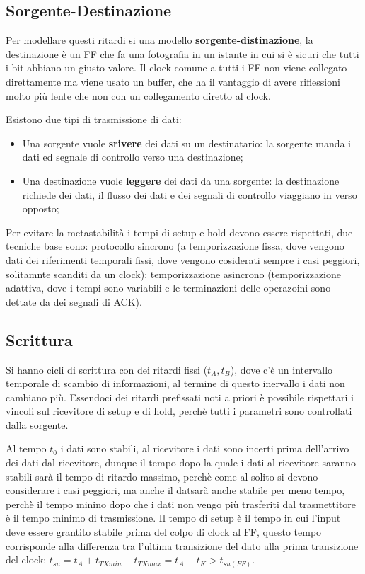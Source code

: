 \documentclass[12pt]{article}
\begin{document}
 \subsection{Sorgente-Destinazione}
Per modellare questi ritardi si una modello \textbf{sorgente-distinazione}, la destinazione \`e un FF che fa una fotografia in un istante in cui si \`e sicuri che tutti i bit abbiano un giusto valore. Il clock comune a tutti i FF non viene collegato direttamente ma viene usato un buffer, che ha il vantaggio di avere riflessioni molto pi\`u lente che non con un collegamento diretto al clock. 

Esistono due tipi di trasmissione di dati:
\begin{itemize}
    \item Una sorgente vuole \textbf{srivere} dei dati su un destinatario: la sorgente manda i dati ed segnale di controllo verso una destinazione;
    \item Una destinazione vuole \textbf{leggere} dei dati da una sorgente: la destinazione \\ richiede dei dati, il flusso dei dati e dei segnali di controllo viaggiano in verso opposto;
\end{itemize}
Per evitare la metastabilit\`a i tempi di setup e hold devono essere rispettati, due tecniche base sono: protocollo sincrono (a temporizzazione fissa, dove vengono dati dei riferimenti temporali fissi, dove vengono cosiderati sempre i casi peggiori, solitamnte scanditi da un clock); temporizzazione asincrono (temporizzazione adattiva, dove i tempi sono variabili e le terminazioni delle operazoini sono dettate da dei segnali di ACK).

\subsection{Scrittura}
Si hanno cicli di scrittura con dei ritardi fissi ($t_A, t_B$), dove c'\`e un intervallo temporale di scambio di informazioni, al termine di questo inervallo i dati non cambiano pi\`u. Essendoci dei ritardi prefissati noti a priori \`e possibile rispettari i vincoli sul ricevitore di setup e di hold, perch\`e tutti i parametri sono controllati dalla sorgente.

Al tempo $t_0$ i dati sono stabili, al ricevitore i dati sono incerti prima dell'arrivo dei dati dal ricevitore, dunque il tempo dopo la quale i dati al ricevitore saranno stabili sar\`a il tempo di ritardo massimo, perch\`e come al solito si devono considerare i casi peggiori, ma anche il datsar\`a anche stabile per meno tempo, perch\`e il tempo minino dopo che i dati non vengo pi\`u trasferiti dal trasmettitore \`e il tempo minimo di trasmissione. Il tempo di setup \`e il tempo in cui l'input deve essere grantito stabile prima del colpo di clock al FF, questo tempo corrisponde alla differenza tra l'ultima transizione del dato alla prima transizione del clock: $t_{su} = t_A + t_{TXmin} - t_{TXmax} = t_A - t_K > t_{su(FF)}$.
\end{document}
